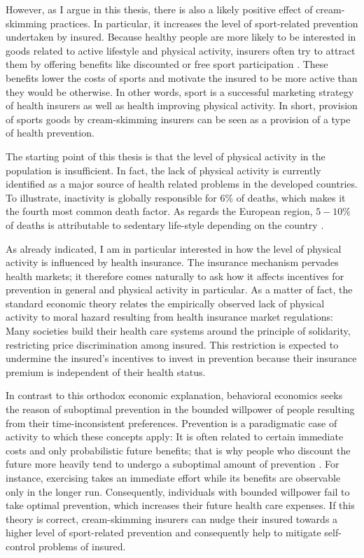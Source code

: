 \documentclass[12pt,english]{article}%
\begin{document}
However, as I argue in this thesis, there is also a likely positive effect of cream-skimming practices. In particular, it increases the level of sport-related prevention undertaken by insured. Because healthy people are more likely to be interested in goods related to active lifestyle and physical activity, insurers often try to attract them by offering benefits like discounted or free sport participation \citep{paolucci2007}. These benefits lower the costs of sports and motivate the insured to be more active than they would be otherwise. In other words, sport is a successful marketing strategy of health insurers as well as health improving physical activity. In short, provision of sports goods by cream-skimming insurers can be seen as a provision of a type of health prevention.  

The starting point of this thesis is that the level of physical activity in the population is insufficient. In fact, the lack of physical activity is currently identified as a major source of health related problems in the developed countries. To illustrate, inactivity is globally responsible for $6\%$ of deaths, which makes it the fourth most common death factor. As regards the European region, $5-10\%$ of deaths is attributable to sedentary life-style depending on the country \citep{who2002,who2009}. 

As already indicated, I am in particular interested in how the level of physical activity is influenced by health insurance. The insurance mechanism pervades health markets; it therefore comes naturally to ask how it affects incentives for prevention in general and physical activity in particular. As a matter of fact, the standard economic theory relates the empirically observed lack of physical activity to moral hazard resulting from health insurance market regulations: Many societies build their health care systems around the principle of solidarity, restricting price discrimination among insured. This restriction is expected to undermine the insured's incentives to invest in prevention because their insurance premium is independent of their health status. 

In contrast to this orthodox economic explanation, behavioral economics seeks the reason of suboptimal prevention in the bounded willpower of people resulting from their time-inconsistent preferences. Prevention is a paradigmatic case of activity to which these concepts apply: It is often related to certain immediate costs and only probabilistic future benefits; that is why people who discount the future more heavily tend to undergo a suboptimal amount of prevention \citep{brandford2010}. For instance, exercising takes an immediate effort while its benefits are observable only in the longer run. Consequently, individuals with bounded willpower fail to take optimal prevention, which increases their future health care expenses. If this theory is correct, cream-skimming insurers can nudge their insured towards a higher level of sport-related prevention and consequently help to mitigate self-control problems of insured.  
\end{document}
